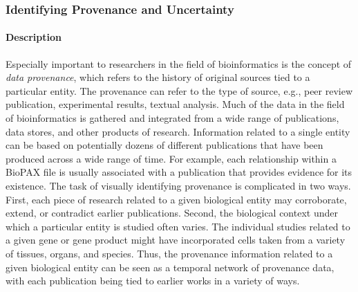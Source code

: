 \documentclass[twocolumn]{bmcart}%
\begin{document}


\subsubsection*{Identifying Provenance and Uncertainty}

\paragraph*{Description}

Especially important to researchers in the field of bioinformatics is the concept of \textit{data provenance}, which refers to the history of original sources tied to a particular entity.
The provenance can refer to the type of source, e.g., peer review publication, experimental results, textual analysis.
Much of the data in the field of bioinformatics is gathered and integrated from a wide range of publications, data stores, and other products of research.
Information related to a single entity can be based on potentially dozens of different publications that have been produced across a wide range of time.
For example, each relationship within a BioPAX file is usually associated with a publication that provides evidence for its existence.
The task of visually identifying provenance is complicated in two ways.
First, each piece of research related to a given biological entity may corroborate, extend, or contradict earlier publications.
Second, the biological context under which a particular entity is studied often varies.
The individual studies related to a given gene or gene product might have incorporated cells taken from a variety of tissues, organs, and species.
Thus, the provenance information related to a given biological entity can be seen as a temporal network of provenance data, with each publication being tied to earlier works in a variety of ways.
\end{document}
